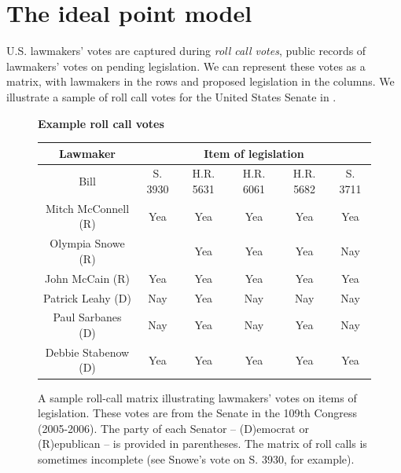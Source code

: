 \section{The ideal point model}
\label{sec:model}


U.S. lawmakers' votes are captured during \textit{roll call votes}, public
records of lawmakers' votes on pending legislation.  We can represent
these votes as a matrix, with lawmakers in the rows and proposed
legislation in the columns.  We illustrate a sample of roll call votes
for the United States Senate in .
\begin{figure}[b]
  \center
  \textbf{Example roll call votes}
  \begin{tabular}{cccccc}
   \hline
   \hline
   \small Lawmaker & \multicolumn{5}{c}{\small Item of legislation} \\
   \hline
   \small Bill & \small  \small S. 3930 & \small  H.R. 5631 & \small  H.R. 6061 & \small  H.R. 5682 & \small  S. 3711 \\
   \small Mitch McConnell (R) & \small  \small Yea & \small  Yea & \small  Yea & \small  Yea & \small  Yea \\
   \small Olympia Snowe (R) & \small   & \small  Yea & \small  Yea & \small  Yea & \small  Nay \\
   \small John McCain (R) & \small  Yea & \small  Yea & \small  Yea & \small  Yea & \small  Yea \\
   \small Patrick Leahy (D) & \small  Nay & \small  Yea & \small  Nay & \small  Nay & \small  Nay \\
   \small Paul Sarbanes (D) & \small  Nay & \small  Yea & \small  Nay & \small  Yea & \small  Nay \\
   \small Debbie Stabenow (D) & \small  Yea & \small  Yea & \small  Yea & \small  Yea & \small  Yea \\
   \hline
 \end{tabular}
 \caption{A sample roll-call matrix illustrating lawmakers' votes on
   items of legislation.  These votes are from the Senate in the 109th
   Congress (2005-2006).  The party of each Senator -- (D)emocrat or
   (R)epublican -- is provided in parentheses. The matrix of roll
   calls is sometimes incomplete (see Snowe's vote on S. 3930, for
   example). }
  \label{fig:roll_call_table}
\end{figure}

